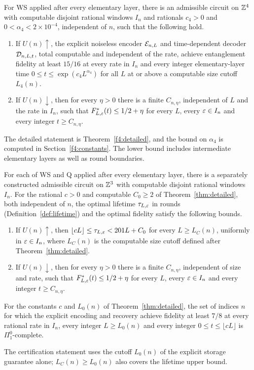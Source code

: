 \begin{maintheorem}\label{thm:four-dimensional}
For \textup{WS} applied after every elementary layer, there is an admissible circuit on \(\mathbb Z^4\) with computable disjoint rational windows \(I_n\) and rationals \(c_4>0\) and \(0<\alpha_4<2\times10^{-4}\), independent of \(n\), such that the following hold.
\begin{enumerate}
\item If \(U(n)\uparrow\), the explicit noiseless encoder \(\mathcal E_{n,L}\) and time-dependent decoder \(\mathcal D_{n,L,t}\), total computable and independent of the rate, achieve entanglement fidelity at least \(15/16\) at every rate in \(I_n\) and every integer elementary-layer time \(0\le t\le \exp(c_4L^{\alpha_4})\) for all \(L\) at or above a computable size cutoff \(L_4(n)\).
\item If \(U(n)\downarrow\), then for every \(\eta>0\) there is a finite \(C_{n,\eta}\), independent of \(L\) and the rate in \(I_n\), such that \(F^*_{L,\varepsilon}(t)\le 1/2+\eta\) for every \(L\), every \(\varepsilon\in I_n\) and every integer \(t\ge C_{n,\eta}\).
\end{enumerate}
\end{maintheorem}

The detailed statement is Theorem~\ref{f4:detailed}, and the bound on \(\alpha_4\) is computed in Section~\ref{f4:constants}. The lower bound includes intermediate elementary layers as well as round boundaries.

\begin{maintheorem}\label{thm:main}
For each of \textup{WS} and \textup{Q} applied after every elementary layer, there is a separately constructed admissible circuit on \(\mathbb Z^3\) with computable disjoint rational windows \(I_n\). For the rational \(c>0\) and computable \(C_0\ge 2\) of Theorem~\ref{thm:detailed}, both independent of \(n\), the optimal lifetime \(\tau_{L,\varepsilon}\) in rounds (Definition~\ref{def:lifetime}) and the optimal fidelity satisfy the following bounds.
\begin{enumerate}
\item If \(U(n)\uparrow\), then \(\lfloor cL\rfloor\le\tau_{L,\varepsilon}<201L+C_0\) for every \(L\ge L_C(n)\), uniformly in \(\varepsilon\in I_n\), where \(L_C(n)\) is the computable size cutoff defined after Theorem~\ref{thm:detailed}.
\item If \(U(n)\downarrow\), then for every \(\eta>0\) there is a finite \(C_{n,\eta}\), independent of size and rate, such that \(F^*_{L,\varepsilon}(t)\le1/2+\eta\) for every \(L\), every \(\varepsilon\in I_n\) and every integer \(t\ge C_{n,\eta}\).
\end{enumerate}
For the constants \(c\) and \(L_0(n)\) of Theorem~\ref{thm:detailed}, the set of indices \(n\) for which the explicit encoding and recovery achieve fidelity at least \(7/8\) at every rational rate in \(I_n\), every integer \(L\ge L_0(n)\) and every integer \(0\le t\le\lfloor cL\rfloor\) is \(\Pi^0_1\)-complete.
\end{maintheorem}
The certification statement uses the cutoff \(L_0(n)\) of the explicit storage guarantee alone; \(L_C(n)\ge L_0(n)\) also covers the lifetime upper bound.

